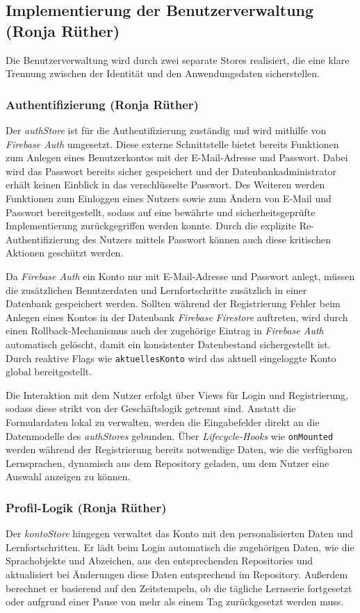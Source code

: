 \subsection{Implementierung der Benutzerverwaltung (Ronja Rüther)}
Die Benutzerverwaltung wird durch zwei separate Stores realisiert, die eine klare Trennung zwischen der Identität und den Anwendungsdaten sicherstellen.

\subsubsection{Authentifizierung (Ronja Rüther)}
Der \textit{authStore} ist für die Authentifizierung zuständig und wird mithilfe von \textit{Firebase Auth} umgesetzt. Diese externe Schnittstelle bietet bereits Funktionen zum Anlegen eines Benutzerkontos mit der E-Mail-Adresse und Passwort.
Dabei wird das Passwort bereits sicher gespeichert und der Datenbankadministrator erhält keinen Einblick in das verschlüsselte Passwort. Des Weiteren werden Funktionen zum Einloggen eines Nutzers sowie zum Ändern von E-Mail und Passwort
bereitgestellt, sodass auf eine bewährte und sicherheitsgeprüfte Implementierung zurückgegriffen werden konnte. Durch die explizite Re-Authentifizierung des Nutzers mittels Passwort können auch diese kritischen Aktionen geschützt werden.

Da \textit{Firebase Auth} ein Konto nur mit E-Mail-Adresse und Passwort anlegt, müssen die zusätzlichen Benutzerdaten und Lernfortschritte zusätzlich in einer Datenbank gespeichert werden. Sollten während der Registrierung Fehler beim Anlegen eines 
Kontos in der Datenbank \textit{Firebase Firestore} auftreten, wird durch einen Rollback-Mechanismus auch der zugehörige Eintrag in \textit{Firebase Auth} automatisch gelöscht, damit ein konsistenter Datenbestand sichergestellt ist.
Durch reaktive Flags wie \texttt{aktuellesKonto} wird das aktuell eingeloggte Konto global bereitgestellt.

Die Interaktion mit dem Nutzer erfolgt über Views für Login und Registrierung, sodass diese strikt von der Geschäftslogik getrennt sind.
Anstatt die Formulardaten lokal zu verwalten, werden die Eingabefelder direkt an die Datenmodelle des \textit{authStores} gebunden.
Über \textit{Lifecycle-Hooks} wie \texttt{onMounted} werden während der Registrierung bereits notwendige Daten, wie die verfügbaren Lernsprachen, dynamisch aus dem
Repository geladen, um dem Nutzer eine Auswahl anzeigen zu können.

\subsubsection{Profil-Logik (Ronja Rüther)}
Der \textit{kontoStore} hingegen verwaltet das Konto mit den personalisierten Daten und Lernfortschritten. 
Er lädt beim Login automatisch die zugehörigen Daten, wie die Sprachobjekte und Abzeichen, aus den entsprechenden Repositories und aktualisiert bei Änderungen diese Daten entsprechend im Repository. 
Außerdem berechnet er basierend auf den Zeitstempeln, ob die tägliche Lernserie fortgesetzt oder aufgrund einer Pause von mehr als einem Tag zurückgesetzt werden muss.

